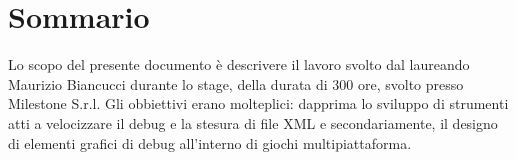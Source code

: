 
\cleardoublepage
{}
{}
\begingroup
\let\clearpage\relax
\let\cleardoublepage\relax
\let\cleardoublepage\relax

\chapter*{Sommario}

Lo scopo del presente documento è descrivere il lavoro svolto dal laureando Maurizio Biancucci durante lo stage, della durata di 300 ore, svolto presso Milestone S.r.l.
Gli obbiettivi erano molteplici: dapprima lo sviluppo di strumenti atti a velocizzare il debug e la stesura di file XML e secondariamente, il designo di elementi grafici di debug all'interno di giochi multipiattaforma.

%
%

\endgroup			

\vfill

